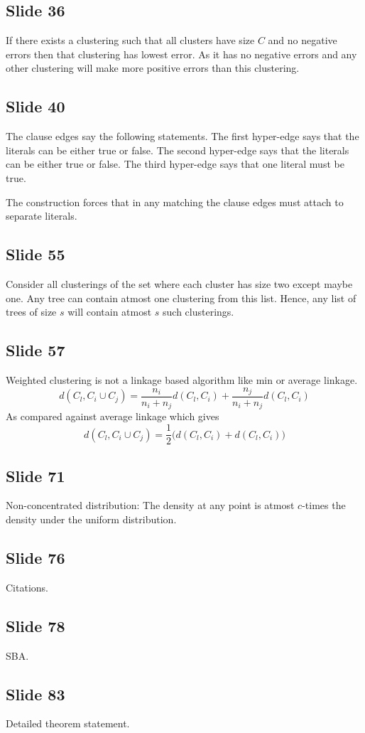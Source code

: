 \documentclass[12pt]{article}
\begin{document}
\subsection*{Slide 36}
If there exists a clustering such that all clusters have size $C$ and no negative errors then that clustering has lowest error. As it has no negative errors and any other clustering will make more positive errors than this clustering. 

\subsection*{Slide 40}
The clause edges say the following statements. The first hyper-edge says that the literals can be either true or false. The second hyper-edge says that the literals can be either true or false. The third hyper-edge says that one literal must be true.

The construction forces that in any matching the clause edges must attach to separate literals. 

\subsection*{Slide 55}
Consider all clusterings of the set where each cluster has size two except maybe one. Any tree can contain atmost one clustering from this list. Hence, any list of trees of size $s$ will contain atmost $s$ such clusterings.


\subsection*{Slide 57}
Weighted clustering is not a linkage based algorithm like min or average linkage. 
$$d(C_l, C_i \cup C_j) = \frac{n_i}{n_i + n_j} d(C_l, C_i) + \frac{n_j}{n_i+n_j}d(C_l, C_i)$$
As compared against average linkage which gives
$$d(C_l, C_i \cup C_j) = \frac{1}{2} \Big(d(C_l, C_i) + d(C_l, C_i) \Big)$$

\subsection*{Slide 71}
Non-concentrated distribution: The density at any point is atmost $c$-times the density under the uniform distribution.

\subsection*{Slide 76}
Citations.

\subsection*{Slide 78}
SBA.

\subsection*{Slide 83}
Detailed theorem statement.
\end{document}
